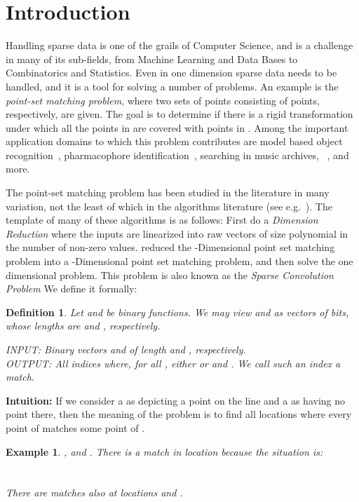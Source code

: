 \documentclass[11pt,amssymb]{article}
\newtheorem{definition}{Definition}
\newtheorem{example}{Example}
\begin{document}
\section{Introduction\label{sec:intro}}

Handling sparse data is one of the grails of Computer Science, and is
a challenge in many of its sub-fields, from Machine Learning and Data
Bases to Combinatorics and Statistics. Even in one dimension sparse
data needs to be handled, and it is a tool for solving a number of
problems. An example is the {\em point-set matching problem}, where
two sets of points  consisting of  points,
respectively, are given. The goal is to determine if there is a rigid
transformation under which all the points in  are covered with
points in . Among the important application domains to which this
problem contributes are model based object
recognition~\cite{rucklidge:96,cyc:02}, pharmacophore
identification~\cite{kavraki:02}, searching in music archives,
~\cite{ulm:03}, and more.

The point-set matching problem has been studied in the literature in
many variation, not the least of which in the algorithms literature
(see e.g.~\cite{sc:98Sch,imv:99,CH:02,akof:03,acg:00,ahsw:03,ds:11}).
The template of many of these algorithms is as follows: First do a
{\it Dimension Reduction} where the inputs  are linearized into
raw vectors  of size polynomial in the number of non-zero values.
reduced the -Dimensional point set matching problem into a
-Dimensional point set matching problem, and then solve the one
dimensional problem. This problem is also known as the {\em Sparse
Convolution Problem} 
We define it formally: 

\begin{definition}
Let  and  be binary functions. We may view  and
 as vectors of bits, whose lengths are  and , respectively.

{\sl INPUT:} Binary vectors  and  of length  and ,
respectively.\\
{\sl OUTPUT:} All indices  where, for all ,
either  or  and . We call such an index
  a {\em match}.
\end{definition}

{\bf Intuition:} If we consider a  as depicting a point on the line
and a  as having no point there, then the meaning of the problem is
to find all locations where every point of  matches some point of .

\begin{example}
, and
. There is a match in location  because the situation
is:\\
\hskip 1in \\
\hskip 1in \\
There are matches also at locations  and .
\end{example}
\end{document}
